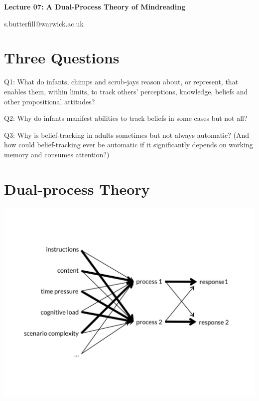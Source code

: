 \documentclass[12pt]{extarticle}
\date{}
\makeatletter
\def \ititle {Philosophical Psychology}
\def \iemail{s.butterfill@warwick.ac.uk}
\makeatother
\begin{document}
\begin{multicols*}{3}

\setlength\footnotesep{1em}











\def \ititle {Lecture 07: A Dual-Process Theory of Mindreading}

\begin{center}

{\Large

\textbf{\ititle}

}



\iemail %

\end{center}

\section{Three Questions}

Q1: What do infants, chimps and scrub-jays reason about, or represent, that enables them, within limits, to track others’ perceptions, knowledge, beliefs and other propositional attitudes?

Q2: Why do infants manifest abilities to track beliefs in some cases but not all?

Q3: Why is belief-tracking in adults sometimes but not always automatic?
(And how could belief-tracking ever be automatic if it significantly depends on working memory and consumes attention?)


\section{Dual-process Theory}

\begin{center}
\includegraphics[scale=0.3]{img/dual_process_operationalized_11.neg.jpg}
\end{center}


\end{multicols*}
\end{document}
